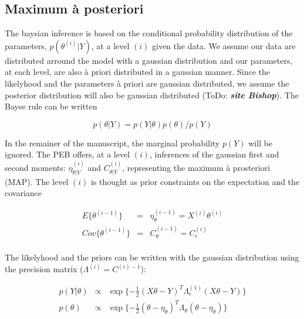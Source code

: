 \documentclass[final, paper=letter,5p,times,twocolumn]{elsarticle}
\newcommand{\ToDo}[1]{ToDo: \textbf{\textit{#1}}}
\theoremstyle{definition}
\begin{document}
\subsection{Maximum \`a posteriori}

The baysian inference is based on the conditional probability distribution of the parameters, $p(\theta^{(i)}|Y)$, at a level $(i)$ given the data. We assume our data are distributed arround the model with a gaussian distribution and our parameters, at each level, are also \`a priori distributed in a gaussian manner. Since the likelyhood and the parameters \`a priori are gaussian distributed, we assume the posterior distribution will also be gaussian distributed (\ToDo{site Bishop}). The Bayse rule can be written

\begin{equation}
  p(\theta | Y) =   p(Y | \theta) p(\theta) / p(Y) 
\end{equation}

In the remainer of the manuscript, the marginal probability $p(Y)$ will be ignored. The PEB offers, at a level $(i)$, inferences of the gaussian first and second moments: $\eta_{\theta|Y}^{(i)}$ and $C_{\theta|Y}^{(i)}$, representing the maximum \`a prosteriori (MAP). The level $(i)$ is thought as prior constraints on the expectation and the covariance


\begin{equation}
  \left .
  \begin{array}{rcl}
    E\{\theta^{(i-1)}\}   & = & \eta_{\theta}^{(i-1)} = X^{(i)}\theta^{(i)} \\
    Cov\{\theta^{(i-1)}\} & = & C_{\theta}^{(i-1)} = C_{\epsilon}^{(i)}\\
  \end{array}
  \right .
  \label{Prior_constraint}
\end{equation}

The likelyhood and the priors can be written with the gaussian distribution using the precision matrix ($\Lambda^{(i)} = C^{(i)-1}$):


\begin{equation*}
  \left .
  \begin{array}{rcl}
    p(Y|\theta) & \propto & \exp\lbrace -\frac{1}{2} (X\theta - Y)^{T} \Lambda_{\epsilon}^{(1)} (X\theta - Y) \rbrace \\
    p(\theta)   & \propto & \exp\lbrace -\frac{1}{2} (\theta - \eta_{\theta})^{T} \Lambda_{\theta} (\theta - \eta_{\theta}) \rbrace \\
  \end{array}
  \right .
\end{equation*}
\end{document}
